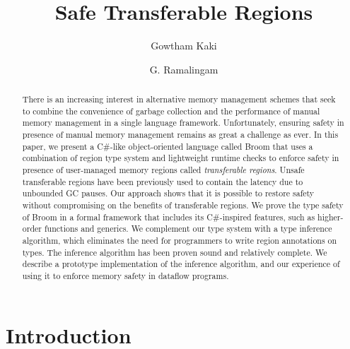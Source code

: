 \documentclass[a4paper,UKenglish]{lipics-v2018}
\title{Safe Transferable Regions}
\author{Gowtham Kaki}
       {Purdue University, USA\footnote{Work done during an internship at
Microsoft Research, India.}}
       {gkaki@purdue.edu}
       {}
       {}%
\author{G. Ramalingam}
       {Microsoft Research, India}
       {grama@microsoft.com}
       {}
       {}%
\begin{document}
\maketitle

\begin{abstract}
There is an increasing interest in alternative memory management
schemes that seek to combine the convenience of garbage collection and
the performance of manual memory management in a single language
framework.  Unfortunately, ensuring safety in presence of manual
memory management remains as great a challenge as ever. In this paper,
we present a C\#-like object-oriented language called {\sc
Broom}\xspace that uses a combination of region type system and
lightweight runtime checks to enforce safety in presence of
user-managed memory regions called \emph{transferable regions}. Unsafe
transferable regions have been previously used to contain the latency
due to unbounded GC pauses. Our approach shows that it is possible to
restore safety without compromising on the benefits of transferable
regions.  We prove the type safety of {\sc Broom}\xspace in a formal
framework that includes its C\#-inspired features, such as
higher-order functions and generics. We complement our type system
with a type inference algorithm, which eliminates the need for
programmers to write region annotations on types. The inference
algorithm has been proven sound and relatively complete. We describe a
prototype implementation of the inference algorithm, and our
experience of using it to enforce memory safety in dataflow programs.
\end{abstract}

\newcommand{\TODO}[1]{\textbf{TODO: #1}} \newcommand{\eg}{\emph{e.g.}}
\newcommand{\ie}{\emph{i.e.}}
\newcommand{\mypara}[1]{\textbf{#1}}

\section{Introduction} \label{sec:introduction}

\end{document}
